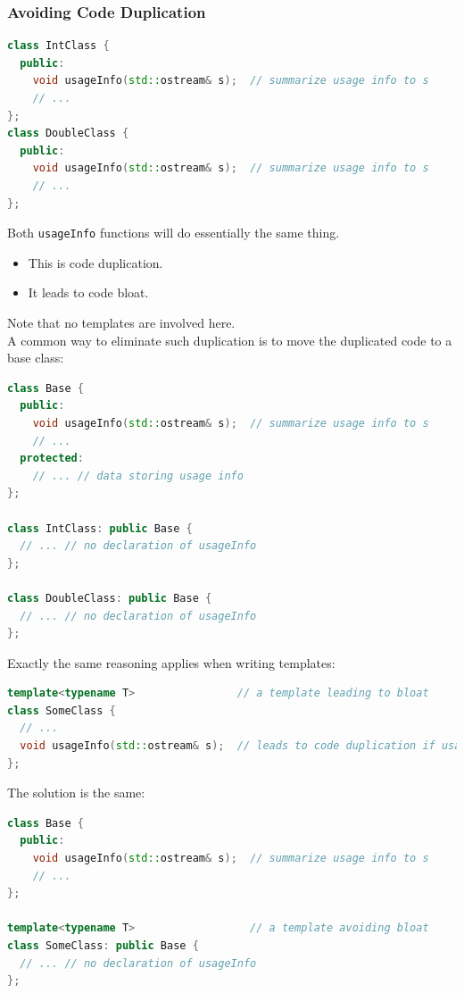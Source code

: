\subsubsection{Avoiding Code Duplication}
\begin{lstlisting}[language=C++]
class IntClass {
  public:
    void usageInfo(std::ostream& s);  // summarize usage info to s
    // ...
};
class DoubleClass {
  public:
    void usageInfo(std::ostream& s);  // summarize usage info to s
    // ...
};
\end{lstlisting}
Both \lstinline[language=C++]{usageInfo} functions will do essentially the same thing.
\begin{itemize}
  \item This is code duplication.
  \item It leads to code bloat.
\end{itemize}
Note that no templates are involved here.\\

A common way to eliminate such duplication is to move the duplicated code to a base class:
\begin{lstlisting}[language=C++]
class Base {
  public:
    void usageInfo(std::ostream& s);  // summarize usage info to s
    // ...
  protected:
    // ... // data storing usage info
};

class IntClass: public Base {
  // ... // no declaration of usageInfo
};

class DoubleClass: public Base {
  // ... // no declaration of usageInfo
};
\end{lstlisting}

Exactly the same reasoning applies when writing templates:
\begin{lstlisting}[language=C++]
template<typename T>                // a template leading to bloat
class SomeClass {
  // ...
  void usageInfo(std::ostream& s);  // leads to code duplication if usageInfo makes no use of T
};
\end{lstlisting}
The solution is the same:
\begin{lstlisting}[language=C++]
class Base {
  public:
    void usageInfo(std::ostream& s);  // summarize usage info to s
    // ...
};

template<typename T>                  // a template avoiding bloat
class SomeClass: public Base {
  // ... // no declaration of usageInfo
};
\end{lstlisting}

